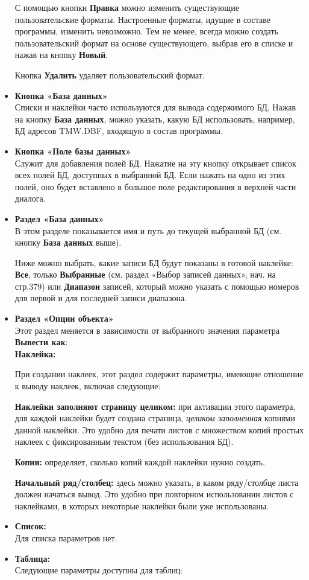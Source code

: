 ﻿\documentclass[a4paper,10pt]{article}
\begin{document}
\begin{itemize}
  С помощью кнопки \textbf{Правка} можно изменить существующие пользовательские форматы. Настроенные форматы, идущие в составе программы, изменить невозможно. Тем не менее, всегда можно создать пользовательский формат на основе существующего, выбрав его в списке и нажав на кнопку \textbf{Новый}.
  
  Кнопка \textbf{Удалить} удаляет пользовательский формат.
  \item \textbf{Кнопка «База данных»}\\
  Списки и наклейки часто используются для вывода содержимого БД. Нажав на кнопку \textbf{База данных}, можно указать, какую БД использовать, например, БД адресов TMW.DBF, входящую в состав программы.
  \item \textbf{Кнопка «Поле базы данных»}\\
  Служит для добавления полей БД. Нажатие на эту кнопку открывает список всех полей БД, доступных в выбранной БД. Если нажать на одно из этих полей, оно будет вставлено в большое поле редактирования в верхней части диалога.
  \item \textbf{Раздел «База данных»}\\
  В этом разделе показывается имя и путь до текущей выбранной БД (см. кнопку \textbf{База данных} выше).
  
  Ниже можно выбрать, какие записи БД будут показаны в готовой наклейке: \textbf{Все}, только \textbf{Выбранные} (см. раздел «Выбор записей данных», нач. на стр.379) или \textbf{Диапазон} записей, который можно указать с помощью номеров для первой и для последней записи диапазона.
  \item \textbf{Раздел «Опции объекта»}\\
  Этот раздел меняется в зависимости от выбранного значения параметра \textbf{Вывести как}:\\
  \textbf{Наклейка:}
  
  При создании наклеек, этот раздел содержит параметры, имеющие отношение к выводу наклеек, включая следующие:
  
  \textbf{Наклейки заполняют страницу целиком:} при активации этого параметра, для каждой наклейки будет создана страница, \textit{целиком заполненная} копиями данной наклейки. Это удобно для печати листов с множеством копий простых наклеек с фиксированным текстом (без использования БД).
  
  \textbf{Копии:} определяет, сколько копий каждой наклейки нужно создать.
  
  \textbf{Начальный ряд/столбец:} здесь можно указать, в каком ряду/столбце листа должен начаться вывод. Это удобно при повторном использовании листов с наклейками, в которых некоторые наклейки были уже использованы.
  \item \textbf{Список:}\\
  Для списка параметров нет.
  \item \textbf{Таблица:}\\
  Следующие параметры доступны для таблиц:
  

\end{itemize}
\end{document}

